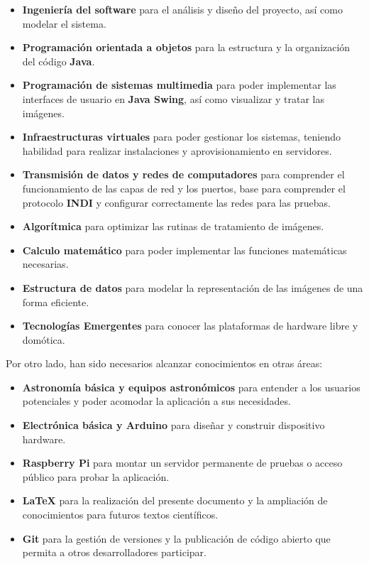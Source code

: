 \begin{itemize}
  \item \textbf{Ingeniería del software} para el análisis y diseño del proyecto, así como modelar el sistema.
  \item \textbf{Programación orientada a objetos} para la estructura y la organización del código \textbf{Java}.
  \item \textbf{Programación de sistemas multimedia} para poder implementar las interfaces de usuario en \textbf{Java Swing}, así como visualizar y tratar las imágenes.
  \item \textbf{Infraestructuras virtuales} para poder gestionar los sistemas, teniendo habilidad para realizar instalaciones y aprovisionamiento en servidores.
  \item \textbf{Transmisión de datos y redes de computadores} para comprender  el funcionamiento de las capas de red y los puertos, base para comprender el protocolo \textbf{INDI} y configurar correctamente las redes para las pruebas.
  \item \textbf{Algorítmica} para optimizar las rutinas de tratamiento de imágenes.
  \item \textbf{Calculo matemático} para poder implementar las funciones matemáticas necesarias. 
  \item \textbf{Estructura de datos} para modelar la representación de las imágenes de una forma eficiente.
  \item \textbf{Tecnologías Emergentes} para conocer las plataformas de hardware libre y domótica. 
\end{itemize}

\bigskip
Por otro lado, han sido necesarios alcanzar conocimientos en otras áreas:

\begin{itemize}

  \item \textbf{Astronomía básica y equipos astronómicos} para entender a los usuarios potenciales y poder acomodar la aplicación a sus necesidades.
  \item \textbf{Electrónica básica y Arduino} para diseñar y construir dispositivo hardware. 
  \item \textbf{Raspberry Pi} para montar un servidor permanente de pruebas o acceso público para probar la aplicación. 
  \item \textbf{\LaTeX} para la realización del presente documento y la ampliación de conocimientos para futuros textos científicos.
  \item \textbf{Git} para la gestión de versiones y la publicación de código abierto que permita a otros desarrolladores participar.
\end{itemize}
